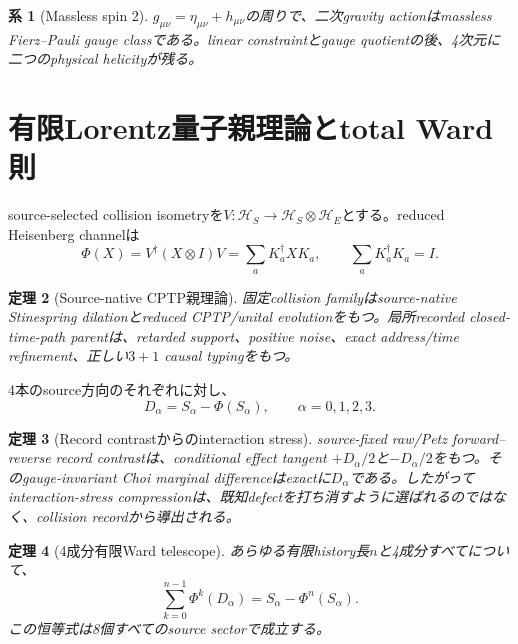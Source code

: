 \documentclass[11pt]{article}
\newtheorem{theorem}{定理}[section]
\newtheorem{corollary}[theorem]{系}
\theoremstyle{definition}
\theoremstyle{remark}
\begin{document}
\begin{corollary}[Massless spin 2]
$g_{\mu\nu}=\eta_{\mu\nu}+h_{\mu\nu}$の周りで、二次gravity actionはmassless Fierz--Pauli gauge classである。linear constraintとgauge quotientの後、4次元に二つのphysical helicityが残る\cite{fierzpauli1939}。
\end{corollary}

\section{有限Lorentz量子親理論とtotal Ward則}

source-selected collision isometryを$V:\mathcal H_S\to\mathcal H_S\otimes\mathcal H_E$とする。reduced Heisenberg channelは
\begin{equation}
\Phi(X)=V^\dagger(X\otimes I)V
=\sum_a K_a^\dagger X K_a,
\qquad \sum_aK_a^\dagger K_a=I.
\label{eq:cptp}
\end{equation}

\begin{theorem}[Source-native CPTP親理論]
固定collision familyはsource-native Stinespring dilationとreduced CPTP/unital evolutionをもつ。局所recorded closed-time-path parentは、retarded support、positive noise、exact address/time refinement、正しい$3+1$ causal typingをもつ\cite{stinespring1955,gorini1976,lindblad1976,feynmanvernon1963}。
\end{theorem}

4本のsource方向のそれぞれに対し、
\begin{equation}
D_\alpha=S_\alpha-\Phi(S_\alpha),
\qquad \alpha=0,1,2,3.
\label{eq:defect}
\end{equation}

\begin{theorem}[Record contrastからのinteraction stress]
source-fixed raw/Petz forward--reverse record contrastは、conditional effect tangent $+D_\alpha/2$と$-D_\alpha/2$をもつ。そのgauge-invariant Choi marginal differenceはexactに$D_\alpha$である。したがってinteraction-stress compressionは、既知defectを打ち消すように選ばれるのではなく、collision recordから導出される。
\end{theorem}

\begin{theorem}[4成分有限Ward telescope]
あらゆる有限history長$n$と4成分すべてについて、
\begin{equation}
\sum_{k=0}^{n-1}\Phi^k(D_\alpha)
=S_\alpha-\Phi^n(S_\alpha).
\label{eq:wardtelescope}
\end{equation}
この恒等式は8個すべてのsource sectorで成立する。
\end{theorem}
\end{document}
